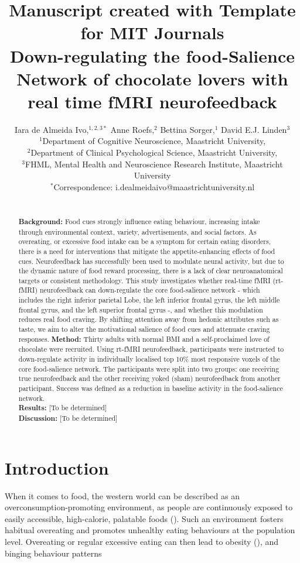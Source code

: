 \documentclass[]{imag-ms-template}
\title{
{\small Manuscript created with Template for MIT Journals} \\
{Down-regulating the food-Salience Network of chocolate lovers with real time fMRI neurofeedback}
}
\author {Iara de Almeida Ivo,$^{1,2,3\ast}$ Anne Roefs,$^{2}$ Bettina Sorger,$^{1}$ David E.J. Linden$^{3}$\\
{\small $^{1}$Department of Cognitive Neuroscience, Maastricht University,}\\
{\small $^{2}$Department of Clinical Psychological Science, Maastricht University,}\\
{\small $^{3}$FHML, Mental Health and Neuroscience Research Institute, Maastricht University}\\
{\small $^\ast$Correspondence:  i.dealmeidaivo@maastrichtuniversity.nl}
}
\begin{document}
 

\maketitle 


\newpage

\begin{abstract}
  \\ \textbf{Background:} Food cues strongly influence eating behaviour, increasing intake through environmental context, variety, advertisements, and social factors. As overeating, or excessive food intake can be a symptom for certain eating disorders, there is a need for interventions that mitigate the appetite-enhancing effects of food cues. Neurofeedback has successfully been used to modulate neural activity, but due to the dynamic nature of food reward processing, there is a lack of clear neuroanatomical targets or consistent methodology. This study investigates whether real-time fMRI (rt-fMRI) neurofeedback can down-regulate the core food-salience network - which includes the right inferior parietal Lobe, the left inferior frontal gyrus, the left middle frontal gyrus, and the left superior frontal gyrus -, and whether this modulation reduces real food craving. By shifting attention away from hedonic attributes such as taste, we aim to alter the motivational salience of food cues and attenuate craving responses. \textbf{Method:} Thirty adults with normal BMI and a self-proclaimed love of chocolate were recruited. Using rt-fMRI neurofeedback, participants were instructed to down-regulate activity in individually localised top 10\% most responsive voxels of the core food-salience network. The participants were split into two groups: one receiving true neurofeedback and the other receiving yoked (sham) neurofeedback from another participant. Success was defined as a reduction in baseline activity in the food-salience network.
  \\\textbf{Results:} [To be determined] \\\textbf{Discussion:} [To be determined]
\end{abstract}

\newpage

\section{Introduction}

When it comes to food, the western world can be described as an overconsumption-promoting environment, as people are continuously exposed to easily accessible, high-calorie, palatable foods (\cite{hillObesityOverviewEpidemic2005}). Such an environment fosters habitual overeating and promotes unhealthy eating behaviours at the population level. Overeating or regular excessive eating can then lead to obesity (\cite{hillObesityOverviewEpidemic2005}), and binging behaviour patterns   
\end{document}
